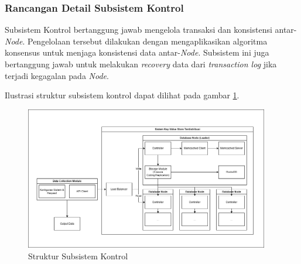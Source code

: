 \subsubsection{Rancangan Detail Subsistem Kontrol}
\label{subsubsection:detail-subsistem-kontrol}
  
Subsistem Kontrol bertanggung jawab mengelola transaksi dan konsistensi antar-\textit{Node}. Pengelolaan tersebut dilakukan dengan mengaplikasikan algoritma konsensus untuk menjaga konsistensi data antar-\textit{Node}. Subsistem ini juga bertanggung jawab untuk melakukan \textit{recovery} data dari \textit{transaction log} jika terjadi kegagalan pada \textit{Node}.

Ilustrasi struktur subsistem kontrol dapat dilihat pada gambar \ref{fig:control-subsystem-structure}.

\begin{figure}[ht]
    \centering
    \includegraphics[width=0.95\textwidth]{resources/chapter-3/general-architecture.png}
    \caption{Struktur Subsistem Kontrol}
    \label{fig:control-subsystem-structure}
\end{figure}